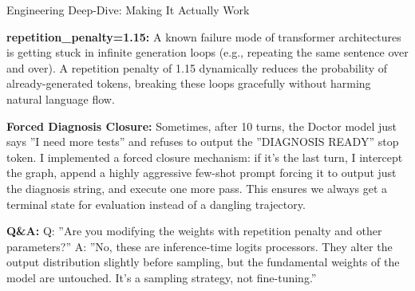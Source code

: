 \documentclass[aspectratio=169,11pt]{beamer}
\begin{document}
\begin{frame}{Engineering Deep-Dive: Making It Actually Work}
{\textbf{repetition\_penalty=1.15:} A known failure mode of transformer architectures is getting stuck in infinite generation loops (e.g., repeating the same sentence over and over). A repetition penalty of 1.15 dynamically reduces the probability of already-generated tokens, breaking these loops gracefully without harming natural language flow.

\textbf{Forced Diagnosis Closure:} Sometimes, after 10 turns, the Doctor model just says ''I need more tests'' and refuses to output the ''DIAGNOSIS READY'' stop token. I implemented a forced closure mechanism: if it's the last turn, I intercept the graph, append a highly aggressive few-shot prompt forcing it to output just the diagnosis string, and execute one more pass. This ensures we always get a terminal state for evaluation instead of a dangling trajectory.

\textbf{Q\&A:}
Q: ''Are you modifying the weights with repetition penalty and other parameters?''
A: ''No, these are inference-time logits processors. They alter the output distribution slightly before sampling, but the fundamental weights of the model are untouched. It's a sampling strategy, not fine-tuning.''
}
\end{frame}
\end{document}
